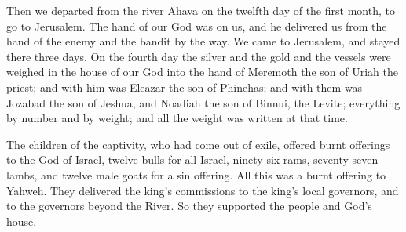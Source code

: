 {Then we departed from the river Ahava on the twelfth day of the first month, to go to Jerusalem. The hand of our God was on us, and he delivered us from the hand of the enemy and the bandit by the way.
We came to Jerusalem, and stayed there three days.
On the fourth day the silver and the gold and the vessels were weighed in the house of our God into the hand of Meremoth the son of Uriah the priest; and with him was Eleazar the son of Phinehas; and with them was Jozabad the son of Jeshua, and Noadiah the son of Binnui, the Levite;
everything by number and by weight; and all the weight was written at that time.
\par }{\PP {}The children of the captivity, who had come out of exile, offered burnt offerings to the God of Israel, twelve bulls for all Israel, ninety-six rams, seventy-seven lambs, and twelve male goats for a sin offering. All this was a burnt offering to Yahweh.
They delivered the king’s commissions to the king’s local governors, and to the governors beyond the River. So they supported the people and God’s house.

}
